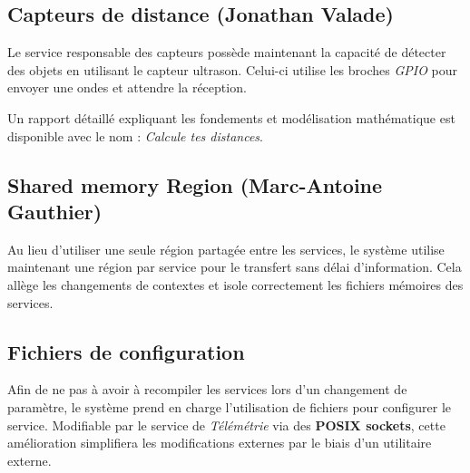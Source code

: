 \subsection{Capteurs de distance (Jonathan Valade)}
Le service responsable des capteurs possède maintenant la capacité de détecter des objets en utilisant le capteur ultrason.
Celui-ci utilise les broches \textit{GPIO} pour envoyer une ondes et attendre la réception.

Un rapport détaillé expliquant les fondements et modélisation mathématique est disponible avec le nom : \textit{Calcule tes distances}.

\subsection{Shared memory Region (Marc-Antoine Gauthier)}
Au lieu d'utiliser une seule région partagée entre les services, le système utilise maintenant une région par service pour le transfert sans délai d'information.
Cela allège les changements de contextes et isole correctement les fichiers mémoires des services.

\subsection{Fichiers de configuration}
Afin de ne pas à avoir à recompiler les services lors d'un changement de paramètre, le système prend en charge l'utilisation de fichiers pour configurer le service.
Modifiable par le service de \textit{Télémétrie} via des \textbf{POSIX sockets}, cette amélioration simplifiera les modifications externes par le biais d'un utilitaire externe.